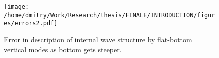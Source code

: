 \documentclass[12pt]{article}
\begin{document}
\begin{figure}
	\texttt{[image: /home/dmitry/Work/Research/thesis/FINALE/INTRODUCTION/figures/errors2.pdf]}
	\caption{Error in description of internal wave structure by flat-bottom vertical modes as 
	bottom gets steeper.}
\end{figure}
% 
%
\end{document}
